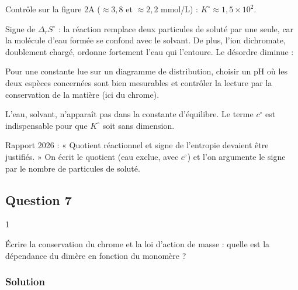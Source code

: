 \documentclass[11pt,a4paper]{article}
\newcommand{\equationajustee}[1]{%
  \sbox{\boiteequation}{$\displaystyle #1$}%
  \ifdim\wd\boiteequation>\linewidth
    \[\resizebox{\linewidth}{!}{\usebox{\boiteequation}}\]%
  \else
    \[#1\]%
  \fi}
\begin{document}
Contrôle sur la figure 2A (\(\approx3{,}8\) et \(\approx2{,}2\) mmol/L) : \(K^\circ\approx1{,}5\times10^2\).

Signe de \(\Delta_rS^\circ\) : la réaction remplace deux particules de soluté par une seule, car la molécule d'eau formée se confond avec le solvant. De plus, l'ion dichromate, doublement chargé, ordonne fortement l'eau qui l'entoure. Le désordre diminue :

\equationajustee{\boxed{\Delta_rS^\circ<0}}

\begin{methode}

Pour une constante lue sur un diagramme de distribution, choisir un pH où les deux espèces concernées sont bien mesurables et contrôler la lecture par la conservation de la matière (ici du chrome).

\end{methode}

\begin{piege}

L'eau, solvant, n'apparaît pas dans la constante d'équilibre. Le terme \(c^\circ\) est indispensable pour que \(K^\circ\) soit sans dimension.

\end{piege}

\begin{jury}

Rapport 2026 : « Quotient réactionnel et signe de l'entropie devaient être justifiés. » On écrit le quotient (eau exclue, avec \(c^\circ\)) et l'on argumente le signe par le nombre de particules de soluté.

\end{jury}

\hypertarget{question-7}{%
\subsection{Question 7}\label{question-7}}

\begin{indication}{1}

Écrire la conservation du chrome et la loi d'action de masse : quelle est la dépendance du dimère en fonction du monomère ?

\end{indication}

\hypertarget{solution-6}{%
\subsubsection{Solution}\label{solution-6}}
\end{document}
